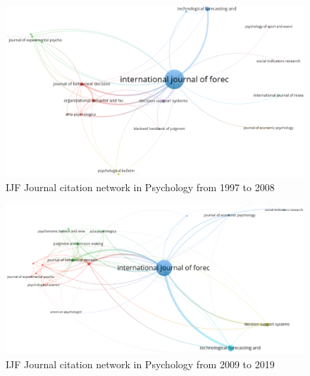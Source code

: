 \documentclass[11pt,a4paper]{elsarticle} %
\begin{document}
\begin{figure}[htbp]
\centering
\includegraphics[scale=0.3]{fig.18.eps}
\caption{IJF Journal citation network in Psychology from 1997 to 2008}
\end{figure}

\begin{figure}[htbp]
\centering
\includegraphics[scale=0.3]{fig.19.eps}
\caption{IJF Journal citation network in Psychology from 2009 to 2019}
\end{figure}
\end{document}
